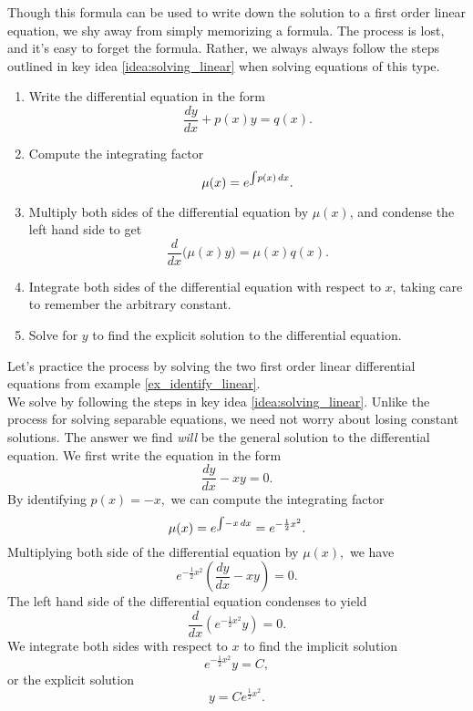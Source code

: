
Though this formula can be used to write down the solution to a first order linear equation, we shy away from simply memorizing a formula. The process is lost, and it's easy to forget the formula. Rather, we always always follow the steps outlined in key idea \ref{idea:solving_linear} when solving equations of this type.

{
\begin{enumerate}
	\item Write the differential equation in the form
		\[
			\frac{dy}{dx} + p(x)y = q(x).
		\]
	\item Compute the integrating factor
		\[
			\mu(x) = e^{\int \hskip -1.5pt p(x)\,dx}.
		\]
	\item Multiply both sides of the differential equation by $\mu(x)$, and condense the left hand side to get
		\[
			\frac{d}{dx}\big( \mu(x)y \big) = \mu(x)q(x).
		\]
	\item Integrate both sides of the differential equation with respect to $x$, taking care to remember the arbitrary constant.
	\item Solve for $y$ to find the explicit solution to the differential equation.
\end{enumerate}
}

Let's practice the process by solving the two first order linear differential equations from example \ref{ex_identify_linear}.\\

{We solve by following the steps in key idea \ref{idea:solving_linear}. Unlike the process for solving separable equations, we need not worry about losing constant solutions.  The answer we find \emph{will} be the general solution to the differential equation. We first write the equation in the form
	\[
		\frac{dy}{dx} - xy = 0.
	\]
By identifying $p(x) = -x,$ we can compute the integrating factor
	\[
		\mu(x) = e^{\int \hskip -1.5pt -x\,dx} = e^{-\frac{1}{2}x^2}.
	\]
Multiplying both side of the differential equation by $\mu(x),$ we have
	\[
		e^{-\frac{1}{2}x^2}\left( \frac{dy}{dx} - xy\right) = 0.
	\]
The left hand side of the differential equation condenses to yield
	\[
		\frac{d}{dx} \left ( e^{-\frac{1}{2}x^2}y\right ) = 0.
	\]
We integrate both sides with respect to $x$ to find the implicit solution
	\[
		e^{-\frac{1}{2}x^2}y = C,
	\]
or the explicit solution
	\[
		y  = Ce^{\frac{1}{2}x^2}.
	\]
}

